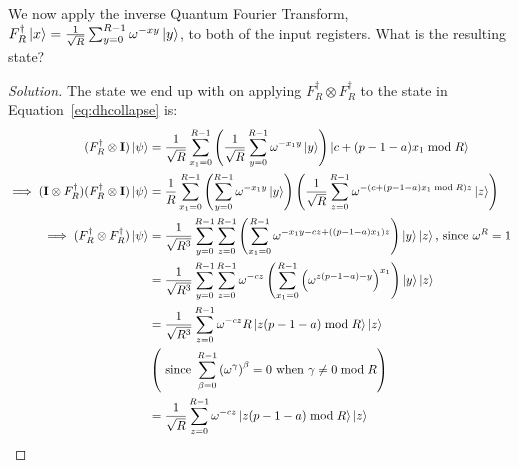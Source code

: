 \begin{solution}[label=ques:4d]
  \begin{question}
    We now apply the inverse Quantum Fourier Transform, $F_R^\dagger\ket{x}=\frac{1}{\sqrt{R}} \sum_{y=0}^{R-1} \omega^{-xy}\ket{y}$, to both of the input registers. What is the resulting state?
  \end{question}
  \tcblower{}
  \begin{proof}[Solution]
    The state we end up with on applying $F_R^\dagger\otimes F_R^\dagger$ to the state in Equation~\ref{eq:dhcollapse} is:
    \begin{equation}
      \begin{split}
        (F_R^\dagger\otimes \mathbf{I})\ket{\psi} &= \frac{1}{\sqrt{R}} \sum_{x_1 = 0}^{R - 1} \left(\frac{1}{\sqrt{R}}\sum_{y=0}^{R - 1}\omega^{-x_1y}\ket{y}\right)\ket{c + (p - 1 - a)x_1 \bmod R}\\
        \implies (\mathbf{I} \otimes F_R^\dagger)(F_R^\dagger\otimes \mathbf{I})\ket{\psi} &= \frac{1}{R} \sum_{x_1 = 0}^{R - 1} \left(\sum_{y=0}^{R - 1}\omega^{-x_1y}\ket{y}\right)\left(\frac{1}{\sqrt{R}}\sum_{z=0}^{R - 1}\omega^{-(c + (p - 1 - a)x_1 \bmod R)z}\ket{z}\right)\\
        \implies (F_R^\dagger\otimes F_R^\dagger)\ket{\psi} &= \frac{1}{\sqrt{R^3}}\sum_{y=0}^{R - 1}\sum_{z=0}^{R - 1}\left(\sum_{x_1=0}^{R-1}\omega^{-x_1y - cz + ((p - 1 - a)x_1)z}\right)\ket{y}\ket{z}\text{, since }\omega^R = 1\\
        &= \frac{1}{\sqrt{R^3}}\sum_{y=0}^{R - 1}\sum_{z=0}^{R - 1}\omega^{-cz}\left(\sum_{x_1=0}^{R-1}{\left(\omega^{z(p-1-a)-y}\right)}^{x_1}\right)\ket{y}\ket{z}\\
        &= \frac{1}{\sqrt{R^3}}\sum_{z=0}^{R - 1}\omega^{-cz}R\ket{z(p - 1 - a)\bmod R}\ket{z}\\
        &\left(\text{ since }\sum_{\beta=0}^{R-1}{\left(\omega^\gamma\right)}^\beta = 0\text{ when }\gamma \neq 0 \bmod R\right)\\
        &= \frac{1}{\sqrt{R}}\sum_{z=0}^{R - 1}\omega^{-cz}\ket{z(p - 1 - a)\bmod R}\ket{z}
      \end{split}
      \label{eq:dhqft}
    \end{equation}
  \end{proof}
\end{solution}

